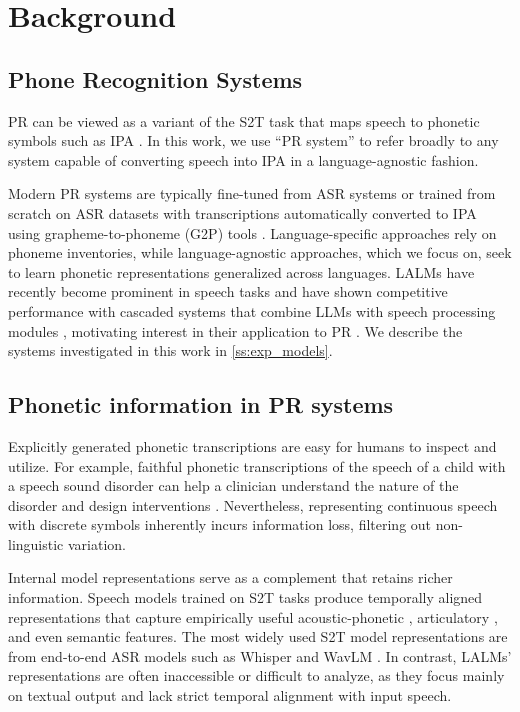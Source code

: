 

\section{Background}

\subsection{Phone Recognition Systems}\label{ss:bg-pr-system}
PR can be viewed as a variant of the S2T task that maps speech to phonetic symbols such as IPA \cite{ipa1999handbook}. In this work, we use ``PR system'' to refer broadly to any system capable of converting speech into IPA in a language-agnostic fashion.

Modern PR systems are typically fine-tuned from ASR systems \cite{baevski2020wav2vec, radford2023robust} or trained from scratch on ASR datasets \cite{zhu-etal-2024-taste} with transcriptions automatically converted to IPA using grapheme-to-phoneme (G2P) tools \cite{mortensen2018epitran, zhu2022charsiu-g2p}.
Language-specific approaches \cite{li2020universal, gao21_interspeech} rely on phoneme inventories, while language-agnostic approaches, which we focus on, seek to learn phonetic representations generalized across languages.
LALMs have recently become prominent in speech tasks and have shown competitive performance with cascaded systems that combine LLMs with speech processing modules \cite{yang2025holisticlalm}, motivating interest in their application to PR \cite{huang2025dynamic, wang2025audiobench}.
We describe the systems investigated in this work in \autoref{ss:exp_models}.


\subsection{Phonetic information in PR systems}\label{ss:bg-phonetic-info}
Explicitly generated phonetic transcriptions are easy for humans to inspect and utilize. 
For example, faithful phonetic transcriptions of the speech of a child with a speech sound disorder can help a clinician understand the nature of the disorder and design interventions \cite{dodd2013differential}.
Nevertheless, representing continuous speech with discrete symbols inherently incurs information loss, filtering out non-linguistic variation.

Internal model representations serve as a complement that retains richer information.
Speech models trained on S2T tasks produce temporally aligned representations that capture empirically useful acoustic-phonetic \cite{choi24b_s3mphonetic}, articulatory \cite{cho2024sslartic}, and even semantic \cite{ma-etal-2025-cross} features.
The most widely used S2T model representations are from end-to-end ASR models such as Whisper \cite{radford2023robust} and WavLM \cite{chen2022wavlm}. 
In contrast, LALMs’ representations are often inaccessible or difficult to analyze, as they focus mainly on textual output and lack strict temporal alignment with input speech.


